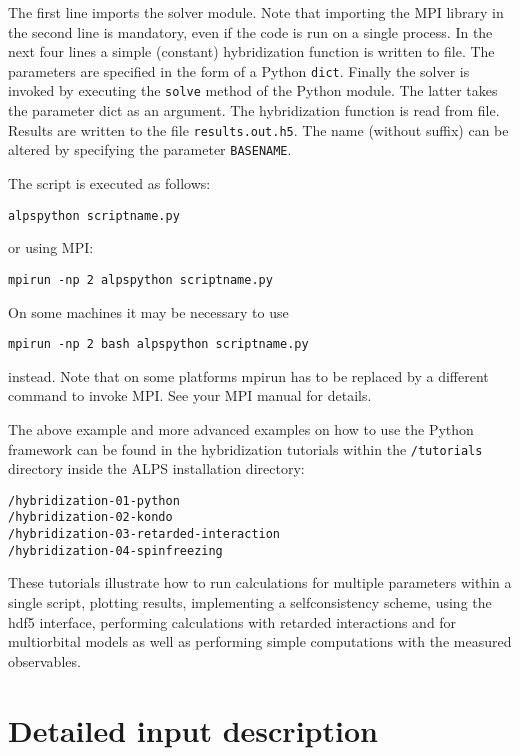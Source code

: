\documentclass[aps,prb,floatfix,superscriptaddress,twocolumn,notitlepage]{revtex4-1}
\begin{document}
The first line imports the solver module. Note that importing the MPI library in the second line is mandatory, even if the code is run on a single process. In the next four lines a simple (constant) hybridization function is written to file.
The parameters are specified in the form of a Python \verb#dict#.
Finally the solver is invoked by executing the \verb#solve# method of the Python module. The latter takes the parameter dict as an argument. The hybridization function is read from file. Results are written to the file \verb#results.out.h5#. The name (without suffix) can be altered by specifying the parameter \verb#BASENAME#.

The script is executed as follows:
\begin{verbatim}
alpspython scriptname.py
\end{verbatim}
or using MPI:
\begin{verbatim}
mpirun -np 2 alpspython scriptname.py
\end{verbatim}
On some machines it may be necessary to use 
\begin{verbatim}
mpirun -np 2 bash alpspython scriptname.py
\end{verbatim}
instead.
Note that on some platforms mpirun has to be replaced by a different command to invoke MPI. See your MPI manual for details. 

The above example and more advanced examples on how to use the Python framework can be found in the hybridization tutorials within the \verb#/tutorials# directory inside the ALPS installation directory:
\begin{verbatim}
/hybridization-01-python
/hybridization-02-kondo
/hybridization-03-retarded-interaction
/hybridization-04-spinfreezing
\end{verbatim}

These tutorials illustrate how to run calculations for multiple parameters within a single script, plotting results, implementing a selfconsistency scheme, using the hdf5 interface, performing calculations with retarded interactions and for multiorbital models as well as performing simple computations with the measured observables.

\section{Detailed input description}
\end{document}
